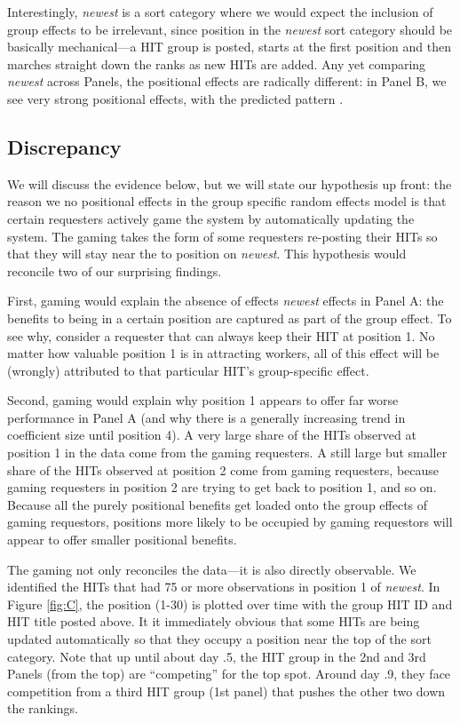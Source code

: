 \documentclass{acm_proc_article-sp}
\begin{document}
Interestingly, {\em newest} is a sort category where we would expect
the inclusion of group effects to be irrelevant, since position in the
{\em newest} sort category should be basically mechanical---a HIT
group is posted, starts at the first position and then marches
straight down the ranks as new HITs are added. Any yet comparing {\em
  newest} across Panels, the positional effects are radically
different: in Panel B, we see very strong positional effects, with the
predicted pattern .

\subsection{Discrepancy}
We will discuss the evidence below, but we will state our hypothesis
up front: the reason we no positional effects in the group specific
random effects model is that certain requesters actively game the
system by automatically updating the system. The gaming takes the form
of some requesters re-posting their HITs so that they will stay near
the to position on {\em newest}. This hypothesis would reconcile two
of our surprising findings.

First, gaming would explain the absence of effects {\em newest}
effects in Panel A: the benefits to being in a certain position are
captured as part of the group effect. To see why, consider a requester
that can always keep their HIT at position 1. No matter how valuable
position 1 is in attracting workers, all of this effect will be
(wrongly) attributed to that particular HIT's group-specific effect.

Second, gaming would explain why position 1 appears to offer far worse
performance in Panel A (and why there is a generally increasing trend
in coefficient size until position 4). A very large share of the HITs
observed at position 1 in the data come from the gaming
requesters. A still large but smaller share of the HITs observed at
position 2 come from gaming requesters, because gaming requesters in
position 2 are trying to get back to position 1, and so on. Because
all the purely positional benefits get loaded onto the group effects
of gaming requestors, positions more likely to be occupied by gaming
requestors will appear to offer smaller positional benefits. 

The gaming not only reconciles the data---it is also directly
observable.  We identified the HITs that had 75 or more observations
in position 1 of {\em newest}. In Figure \ref{fig:C}, the position
(1-30) is plotted over time with the group HIT ID and HIT title posted
above.  It it immediately obvious that some HITs are being updated
automatically so that they occupy a position near the top of the sort
category. Note that up until about day .5, the HIT group in the 2nd
and 3rd Panels (from the top) are ``competing'' for the top
spot. Around day .9, they face competition from a third HIT group
(1st panel) that pushes the other two down the rankings.
\end{document}
